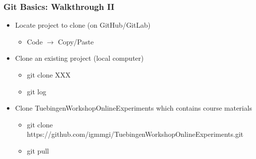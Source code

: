 \documentclass[t]{beamer}
\begin{document}
\begin{frame}[fragile]
    \frametitle{Git Basics: Walkthrough II}
    \begin{itemize}
        \item Locate project to clone (on GitHub/GitLab)
            \begin{itemize}\scriptsize
                \item Code $\rightarrow$ Copy/Paste
            \end{itemize}
        \item Clone an existing project (local computer)
            \begin{itemize}\scriptsize
                \item git clone XXX 
                \item git log
            \end{itemize}
        \item Clone TuebingenWorkshopOnlineExperiments which contains course materials
            \begin{itemize}\scriptsize
                \item git clone https://github.com/igmmgi/TuebingenWorkshopOnlineExperiments.git
                \item git pull
            \end{itemize}
    \end{itemize}
\end{frame}


\end{document}
